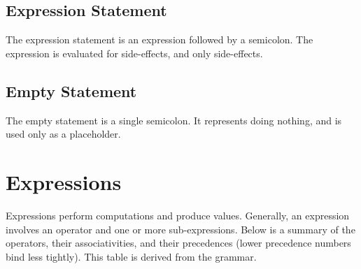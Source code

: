 \documentclass[letterpaper,12pt]{book}
\begin{document}
\section{Expression Statement}



The expression statement is an expression followed by a semicolon. The expression is evaluated for side-effects, and only side-effects.

\section{Empty Statement}

The empty statement is a single semicolon. It represents doing nothing, and is used only as a placeholder.

\chapter{Expressions}

Expressions perform computations and produce values. Generally, an expression involves an operator and one or more sub-expressions. Below is a summary of the operators, their associativities, and their precedences (lower precedence numbers bind less tightly). This table is derived from the grammar.
\end{document}
